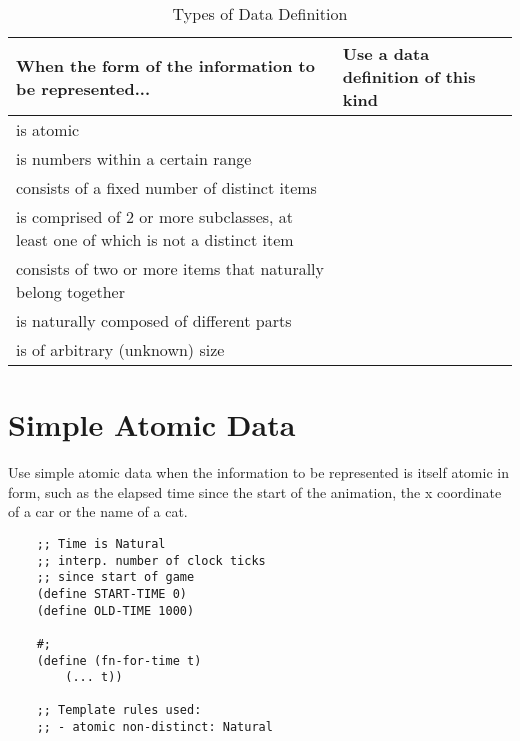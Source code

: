 \documentclass[11pt,a4paper]{report}
\begin{document}
	\begin{table}[h]
		\renewcommand{\arraystretch}{1.5}
		\renewcommand{\tabcolsep}{0.2cm}
		\begin{tabularx}{\textwidth}{|X|X|}
			\hline
			\textbf{When the form of the information to be represented...}                     & \textbf{Use a data definition of this kind} \\
			\hline
			is atomic                                                                          &      \nameref{sec:simple_atomic_data}       \\
			\hline
			is numbers within a certain range                                                  &           \nameref{sec:interval}            \\
			\hline
			consists of a fixed number of distinct items                                       &         \nameref{sec:enumerations}          \\
			\hline
			is comprised of 2 or more subclasses, at least one of which is not a distinct item &         \nameref{sec:itemizations}          \\
			\hline
			consists of two or more items that naturally belong together                       &                \nameref{sec:compound_data}                \\
			\hline
			is naturally composed of different parts                                           &      \nameref{sec:ref_other_data_def}       \\
			\hline
			is of arbitrary (unknown) size                                                     &  \nameref{sec:self_or_mut_ref}   \\
			\hline
		\end{tabularx}
		\caption{Types of Data Definition}
	\end{table}
	\pagebreak
	\section{Simple Atomic Data} \label{sec:simple_atomic_data}
	Use simple atomic data when the information to be represented is itself atomic in form, such as
	the elapsed time since the start of the animation, the x coordinate of a car or the name of a cat.
	
	\begin{verbatim}
	;; Time is Natural
	;; interp. number of clock ticks 
	;; since start of game
	(define START-TIME 0)
	(define OLD-TIME 1000)
	
	#;
	(define (fn-for-time t)
		(... t))
	
	;; Template rules used:
	;; - atomic non-distinct: Natural
	\end{verbatim}
	
\end{document}
